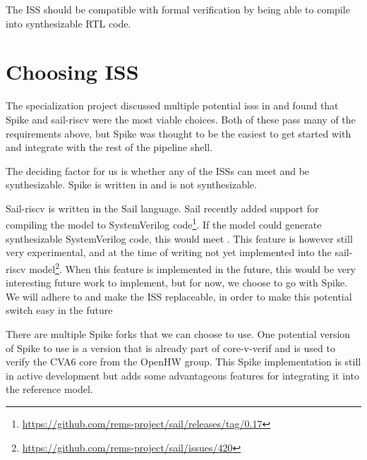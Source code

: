 \begin{enumerate}
\par The ISS should be compatible with formal verification by being able to compile into synthesizable RTL code.



\end{enumerate}

\section{Choosing ISS}

The specialization project discussed multiple potential \acrshort{iss}s in  and found that Spike \cite{SpikeRISCVISA2023} and sail-riscv \cite{RISCVSailModel2023} were the most viable choices. Both of these pass many of the requirements above, but Spike was thought to be the easiest to get started with and integrate with the rest of the pipeline shell. 

The deciding factor for us is whether any of the ISSs can meet  and be synthesizable. Spike is written in \cpp and is not synthesizable. 

Sail-riscv is written in the Sail language. Sail recently added support for compiling the model to SystemVerilog code\footnote{\url{https://github.com/rems-project/sail/releases/tag/0.17}}. If the model could generate synthesizable SystemVerilog code, this would meet . This feature is however still very experimental, and at the time of writing not yet implemented into the sail-riscv model\footnote{\url{https://github.com/rems-project/sail/issues/420}}.
When this feature is implemented in the future, this would be very interesting future work to implement, but for now, we choose to go with Spike.
We will adhere to  and make the ISS replaceable, in order to make this potential switch easy in the future


There are multiple Spike forks that we can choose to use. One potential version of Spike to use is a version that is already part of core-v-verif and is used to verify the CVA6 core from the OpenHW group. This Spike implementation is still in active development but adds some advantageous features for integrating it into the reference model.

